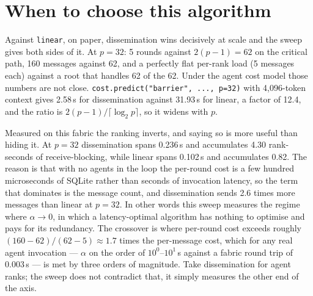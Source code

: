 \documentclass[11pt]{article}
\begin{document}
\section{When to choose this algorithm}

Against \texttt{linear}, on paper, dissemination wins decisively at scale and the sweep gives
both sides of it. At $p=32$: 5 rounds against $2(p-1) = 62$ on the critical path, 160 messages
against 62, and a perfectly flat per-rank load (5 messages each) against a root that handles 62
of the 62. Under the agent cost model those numbers are not close.
\texttt{cost.predict("barrier", ..., p=32)} with 4,096-token context gives 2.58\,s for
dissemination against 31.93\,s for linear, a factor of 12.4, and the ratio is
$2(p-1)/\lceil\log_2 p\rceil$, so it widens with $p$.

Measured on this fabric the ranking inverts, and saying so is more useful than hiding it. At
$p=32$ dissemination spans 0.236\,s and accumulates 4.30 rank-seconds of receive-blocking, while
linear spans 0.102\,s and accumulates 0.82. The reason is that with no agents in the loop the
per-round cost is a few hundred microseconds of SQLite rather than seconds of invocation
latency, so the term that dominates is the message count, and dissemination sends 2.6 times more
messages than linear at $p=32$. In other words this sweep measures the regime where
$\alpha \to 0$, in which a latency-optimal algorithm has nothing to optimise and pays for its
redundancy. The crossover is where per-round cost exceeds roughly
$(160 - 62)/(62 - 5) \approx 1.7$ times the per-message cost, which for any real agent
invocation --- $\alpha$ on the order of $10^0$--$10^1$\,s against a fabric round trip of
0.003\,s --- is met by three orders of magnitude. Take dissemination for agent ranks; the sweep
does not contradict that, it simply measures the other end of the axis.
\end{document}
